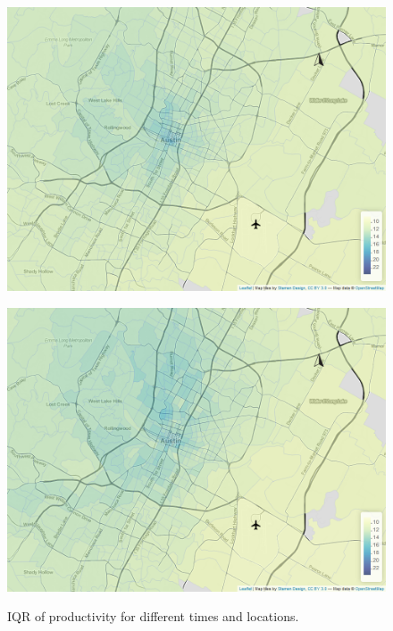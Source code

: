 \documentclass[a4paper, 11pt]{article}
\begin{document}
\begin{figure}[tb]
\begin{minipage}[tb]{0.48\linewidth}
        \label{fig:iqr:b}
    \end{minipage}\hfill
    \begin{minipage}[tb]{.48\linewidth}
        \centering
        \includegraphics[width=\linewidth]{img/quantile_142_1.png}
        \label{fig:iqr:c}
    \end{minipage}
    \begin{minipage}[tb]{0.48\linewidth}
        \centering
        \includegraphics[width=\linewidth]{img/quantile_168_1.png}
        \label{fig:iqr:d}
    \end{minipage}
    \caption{IQR of productivity for different times and locations.}
    \label{fig:iqr}
\end{figure}
\end{document}
